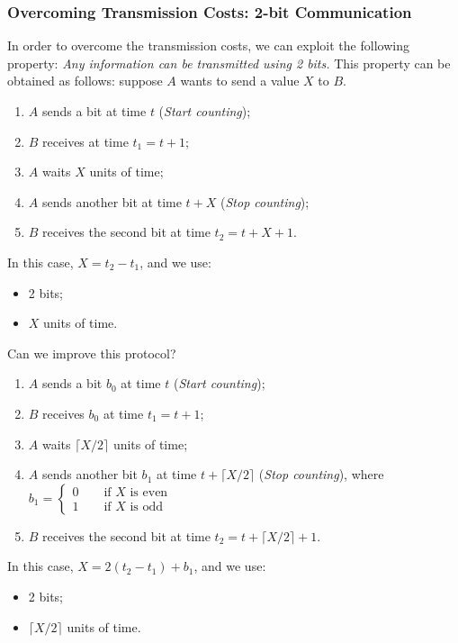 \subsubsection{Overcoming Transmission Costs: 2-bit Communication}
In order to overcome the transmission costs, we can exploit the following property: \textit{Any information can be transmitted using 2 bits.} This property can be obtained as follows: suppose $A$ wants to send a value $X$ to $B$.

\begin{enumerate}
    \item $A$ sends a bit at time $t$ (\textit{Start counting});
    \item $B$ receives at time $t_1 = t+1$;
    \item $A$ waits $X$ units of time;
    \item $A$ sends another bit at time $t+X$ (\textit{Stop counting});
    \item $B$ receives the second bit at time $t_2 = t+X+1$.
\end{enumerate}


In this case, $X = t_2 - t_1$, and we use:
\begin{itemize}
    \item 2 bits;
    \item $X$ units of time.
\end{itemize}

Can we improve this protocol?
\begin{enumerate}
    \item $A$ sends a bit $b_0$ at time $t$ (\textit{Start counting});
    \item $B$ receives $b_0$ at time $t_1 = t+1$;
    \item $A$ waits $\lceil X/2 \rceil$ units of time;
    \item $A$ sends another bit $b_1$ at time $t+ \lceil X/2 \rceil$ (\textit{Stop counting}), where $b_1 = \begin{cases}
        0 \qquad \text{if } X \text{ is even} \\
        1 \qquad \text{if } X \text{ is odd}
    \end{cases}$
    \item $B$ receives the second bit at time $t_2 = t+\lceil X/2 \rceil+1$.
\end{enumerate}

In this case, $X = 2(t_2-t_1) + b_1$, and we use:
\begin{itemize}
    \item 2 bits;
    \item $\lceil X/2 \rceil$ units of time.
\end{itemize}

